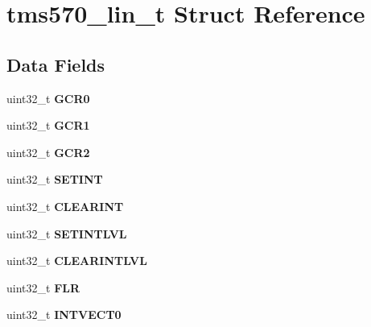 \hypertarget{structtms570__lin__t}{}\section{tms570\+\_\+lin\+\_\+t Struct Reference}
\label{structtms570__lin__t}
\subsection*{Data Fields}
\begin{DoxyCompactItemize}
\item 
\mbox{\label{structtms570__lin__t_ad223c4d07e8d0a2699e410b7071923cb}} 
uint32\+\_\+t {\bfseries G\+C\+R0}
\item 
\mbox{\label{structtms570__lin__t_a43e26f54eb5f9a0c12d5f113b591d7cc}} 
uint32\+\_\+t {\bfseries G\+C\+R1}
\item 
\mbox{\label{structtms570__lin__t_a0420f28d34a0d38fa4fe2d81078a8b03}} 
uint32\+\_\+t {\bfseries G\+C\+R2}
\item 
\mbox{\label{structtms570__lin__t_a14d897f25e756651ece633e8a1b93591}} 
uint32\+\_\+t {\bfseries S\+E\+T\+I\+NT}
\item 
\mbox{\label{structtms570__lin__t_acec71753f4fbb8e1c75c55593a6e9ce0}} 
uint32\+\_\+t {\bfseries C\+L\+E\+A\+R\+I\+NT}
\item 
\mbox{\label{structtms570__lin__t_a78bd956b9c7d528813f191eaa5937a3f}} 
uint32\+\_\+t {\bfseries S\+E\+T\+I\+N\+T\+L\+VL}
\item 
\mbox{\label{structtms570__lin__t_a1dae28e15e9f87e867ba077fad18d6db}} 
uint32\+\_\+t {\bfseries C\+L\+E\+A\+R\+I\+N\+T\+L\+VL}
\item 
\mbox{\label{structtms570__lin__t_a82fa783d9678a5e9c7861d6eaccc28bc}} 
uint32\+\_\+t {\bfseries F\+LR}
\item 
\mbox{\label{structtms570__lin__t_aee6305a4a2653153023835378bee07f0}} 
uint32\+\_\+t {\bfseries I\+N\+T\+V\+E\+C\+T0}

\end{DoxyCompactItemize}
